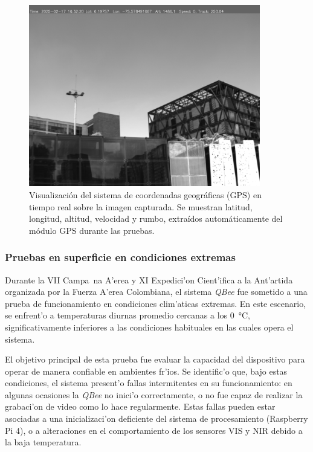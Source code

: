         \begin{figure}[h]
            \centering
            \includegraphics[width=0.9\textwidth]{Figures/C4/captured_image_20250217_113221.jpg}
            \caption{Visualización del sistema de coordenadas geográficas (GPS) en tiempo real sobre la imagen capturada. Se muestran latitud, longitud, altitud, velocidad y rumbo, extraídos automáticamente del módulo GPS durante las pruebas.}
            \label{fig:gps_overlay_visual}
        \end{figure}



    \subsubsection{Pruebas en superficie en condiciones extremas}

    Durante la VII Campa~na A'erea y XI Expedici'on Cient'ifica a la Ant'artida organizada por la Fuerza A'erea Colombiana, el sistema \textit{QBee} fue sometido a una prueba de funcionamiento en condiciones clim'aticas extremas. En este escenario, se enfrent'o a temperaturas diurnas promedio cercanas a los \SI{0}{\celsius}, significativamente inferiores a las condiciones habituales en las cuales opera el sistema.
    
    \noindent El objetivo principal de esta prueba fue evaluar la capacidad del dispositivo para operar de manera confiable en ambientes fr'ios. Se identific'o que, bajo estas condiciones, el sistema present'o fallas intermitentes en su funcionamiento: en algunas ocasiones la \textit{QBee} no inici'o correctamente, o no fue capaz de realizar la grabaci'on de video como lo hace regularmente. Estas fallas pueden estar asociadas a una inicializaci'on deficiente del sistema de procesamiento (Raspberry Pi 4), o a alteraciones en el comportamiento de los sensores VIS y NIR debido a la baja temperatura.
    
